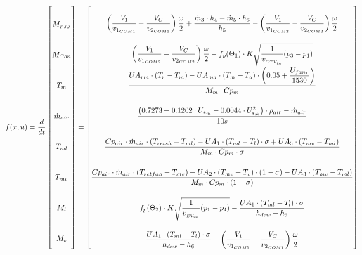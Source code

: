 \begin{equation} \label{eq:f_Sub} \renewcommand{\arraystretch}{3.4}
	f(x,u) =   \dfrac{d}{dt} \begin{bmatrix}
		M_{_{PJJ}}		\\				%
		M_{Con} 		\\				%
		T_m 			\\				%
		\dot{m}_{air}	\\				%
		T_{ml}			\\				%
		T_{mv}			\\				%
		M_l				\\				%
		M_v				\\				%
	\end{bmatrix}
	=
	\begin{bmatrix}
		\left(\dfrac{V_1}{v_{1_{COM1}}} - \dfrac{V_C}{v_{2_{COM1}}}\right) \dfrac{\omega}{2} + \dfrac{\dot{m}_{3} \cdot h_4 - \dot{m}_{5} \cdot h_6}{h_5} - \left(\dfrac{V_1}{v_{1_{COM2}}} - \dfrac{V_C}{v_{2_{COM2}}}\right) \dfrac{\omega}{2} \\										%
		\left(\dfrac{V_1}{v_{1_{COM2}}} - \dfrac{V_C}{v_{2_{COM2}}}\right) \dfrac{\omega}{2} - f_p(\Theta_1) \cdot K  \sqrt{\dfrac{1}{v_{_{CTV_{in}}}} (p_{3} - p_{1})}	\\												%
		\dfrac{U A_{rm} \cdot (T_r - T_m) - U A_{ma} \cdot (T_m - T_a)\cdot \left(0.05 + \dfrac{U_{fan_1}}{1530}\right)}{M_m \cdot Cp_m} \\									%
		\dfrac{\left( 0.7273 + 0.1202 \cdot U_{*_{\dot{m}}}  -0.0044 \cdot	U_{*_{\dot{m}}}^2 \right) \cdot \rho_{air}  - \dot{m}_{air}} {10s}		\\					%
		\dfrac{Cp_{air} \cdot \dot{m}_{air} \cdot (T_{retsh} - T_{ml})-U A_1 \cdot (T_{ml} - T_l) \cdot \sigma + U A_3 \cdot (T_{mv} - T_{ml})}{M_m \cdot Cp_m \cdot \sigma}        \\	%
		\dfrac{Cp_{air} \cdot \dot{m}_{air} \cdot (T_{retfan} - T_{mv}) - U A_2 \cdot (T_{mv} - T_v) \cdot (1- \sigma) - U A_3 \cdot (T_{mv} - T_{ml})}{M_m \cdot Cp_m \cdot (1- \sigma)}	\\	%
		f_p(\Theta_2) \cdot K  \sqrt{\dfrac{1}{v_{_{EV_{in}}}} (p_{1} - p_{4})} - \dfrac{U A_1 \cdot (T_{ml} - T_l) \cdot \sigma}{h_{dew} - h_{6}}		\\											%
		\dfrac{U A_1 \cdot (T_{ml} - T_l) \cdot \sigma}{h_{dew} - h_{6}} - \left(\dfrac{V_1}{v_{1_{COM1}}} - \dfrac{V_C}{v_{2_{COM1}}}\right) \dfrac{\omega}{2}	\\												%
	\end{bmatrix}
\end{equation}





